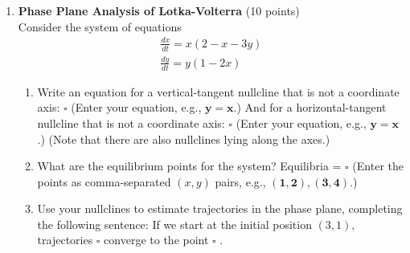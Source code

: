 \begin{enumerate}
  \item \textbf{Phase Plane Analysis of Lotka-Volterra} (10 points)\\
  Consider the system of equations
  $$
  \begin{gathered}
  \frac{d x}{d t}=x(2-x-3 y) \\
  \frac{d y}{d t}=y(1-2 x)
  \end{gathered}
  $$
  \begin{enumerate}[label=(\alph*)]
    \item Write an equation for a vertical-tangent nullcline that is not a coordinate axis:
    $\square$
    (Enter your equation, e.g., $\boldsymbol{y}=\boldsymbol{x}$.)
    And for a horizontal-tangent nullcline that is not a coordinate axis:
    $\square$
    (Enter your equation, e.g., $\boldsymbol{y}=\boldsymbol{x}$.)
    (Note that there are also nullclines lying along the axes.)
    \begin{subanswer}
    \end{subanswer}
    \item What are the equilibrium points for the system?
    Equilibria = $\square$
    (Enter the points as comma-separated $(x, y)$ pairs, e.g., $(\mathbf{1 , 2}),(\mathbf{3 , 4})$.)
    \begin{subanswer}
    \end{subanswer}
    \item Use your nullclines to estimate trajectories in the phase plane, completing the following sentence:
    If we start at the initial position $(3,1)$, trajectories $\square$ converge to the point $\square$ .
    \begin{subanswer}
    \end{subanswer}
  \end{enumerate}


\end{enumerate}
